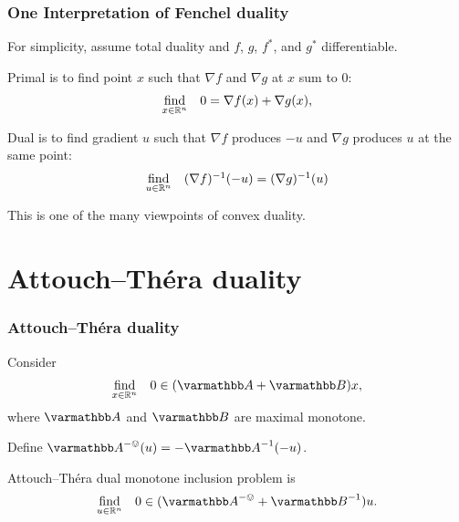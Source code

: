 \documentclass[10pt,mathserif]{beamer}
\begin{document}
\begin{frame}
\frametitle{One Interpretation of Fenchel duality}
For simplicity, assume total duality and $f$, $g$, $f^*$, and $g^*$ differentiable.
\vspace{0.2in}


Primal is to find point $x$ such that $\nabla f$ and $\nabla g$ at $x$ sum to $0$:
\[ 
\begin{array}{ll}
\underset{x\in\mathbb{R}^n}{\mathrm{find}} &
0=\nabla f(x)+\nabla g(x),
\end{array}
\]
\vspace{0.2in}

Dual is to find gradient $u $ such that $\nabla f$ produces $-u $ and $\nabla g$ produces $u $ at the same point:
\[ 
\begin{array}{ll}
\underset{u \in\mathbb{R}^n}{\mathrm{find}} &
(\nabla f)^{-1}(-u )=(\nabla g)^{-1}(u )
\end{array}
\]


\vspace{0.2in}
This is one of the many viewpoints of convex duality.

\end{frame}







\section{Attouch--Th\'era duality}
\begin{frame}
\frametitle{Attouch--Th\'era duality}
Consider
\[ 
\begin{array}{ll}
\underset{x\in\reals^n}{\mathrm{find}} &
0\in (\opA+\opB)x,
\end{array}
\]
where $\opA$ and $\opB$ are maximal monotone.

\vspace{0.2in}

Define $\opA^{-\ovee}(u )=-\opA^{-1}(-u )$.
\vspace{0.2in}

 Attouch--Th\'era dual monotone inclusion problem is 
\[ 
\begin{array}{ll}
\underset{u \in\reals^n}{\mathrm{find}} &
0\in (\opA^{-\ovee}+\opB^{-1})u .
\end{array}
\]
\end{frame}
\end{document}
